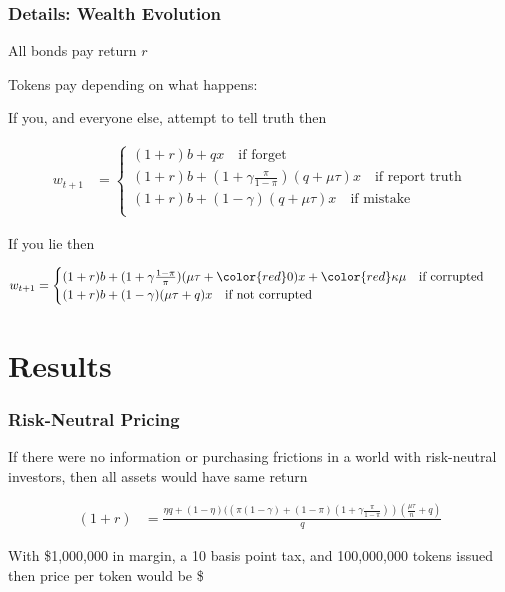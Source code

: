 \documentclass[10pt]{beamer}
\begin{document}
\begin{frame} \frametitle{Details: Wealth Evolution}

  All bonds pay return $r$

  Tokens pay depending on what happens:

  If you, and everyone else, attempt to tell truth then

  \begin{align*}
    w_{t+1} &= \begin{cases} (1 + r) b + q x \quad \text{if forget} \\
                             (1 + r) b + (1 + \gamma \frac{\pi}{1 - \pi}) (q + \mu \tau) x \quad \text{if report truth} \\
                             (1 + r) b + (1 - \gamma) (q + \mu \tau) x \quad \text{if mistake} \\
               \end{cases}
  \end{align*}

  If you lie then

  \begin{align*}
    w_{t+1} &= \begin{cases} (1 + r)b + (1 + \gamma \frac{1 - \pi}{\pi})(\mu \tau + {\color{red} 0}) x + {\color{red}\kappa \mu} \quad \text{if corrupted} \\
                             (1 + r)b + (1 - \gamma)(\mu \tau + q) x \quad \text{if not corrupted}
               \end{cases}
  \end{align*}

\end{frame}

\section{Results}

\begin{frame} \frametitle{Risk-Neutral Pricing}

  If there were no information or purchasing frictions in a world with risk-neutral
  investors, then all assets would have same return

  \begin{align*}
    (1 + r) &= \frac{\eta q + (1 - \eta) ( (\pi (1 - \gamma) + (1 - \pi) (1 + \gamma \frac{\pi}{1 - \pi})) (\frac{\mu \tau}{n} + q)}{q}
  \end{align*}

  With \$1,000,000 in margin, a 10 basis point tax, and 100,000,000 tokens issued then price per token would be \$

\end{frame}
\end{document}

